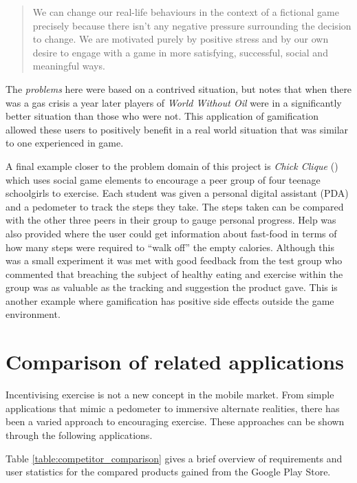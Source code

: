 \begin{quote}
  We can change our real-life
  behaviours in the context of a fictional game precisely because there
  isn't any negative pressure surrounding the decision to change. We
  are motivated purely by positive stress and by our own desire to
  engage with a game in more satisfying, successful, social and
  meaningful ways.
\end{quote}

The \emph{problems} here were based on a contrived situation, but
\citeauthor{reality_broken} notes that when there was a gas crisis a
year later players of \emph{World Without Oil} were in a significantly
better situation than those who were not. This application of
gamification allowed these users to positively benefit in a real world
situation that was similar to one experienced in game.

A final example closer to the problem domain of this project is
\emph{Chick Clique} (\citet{chick}) which uses social game elements to
encourage a peer group of four teenage schoolgirls to exercise. Each
student was given a personal digital assistant (PDA) and a pedometer
to track the steps they take. The steps taken can be compared with the
other three peers in their group to gauge personal progress. Help was
also provided where the user could get information about fast-food in
terms of how many steps were required to ``walk off'' the empty
calories. Although this was a small experiment it was met with good
feedback from the test group who commented that breaching the subject
of healthy eating and exercise within the group was as valuable as the
tracking and suggestion the product gave. This is another example
where gamification has positive side effects outside the game
environment.

\section{Comparison of related applications}\label{sec_comparison}
Incentivising exercise is not a new concept in the mobile market. From
simple applications that mimic a pedometer to immersive alternate
realities, there has been a varied approach to encouraging
exercise. These approaches can be shown through the following
applications. 

Table \ref{table:competitor_comparison} gives a brief
overview of requirements and user statistics for the compared products
gained from the Google Play Store.

